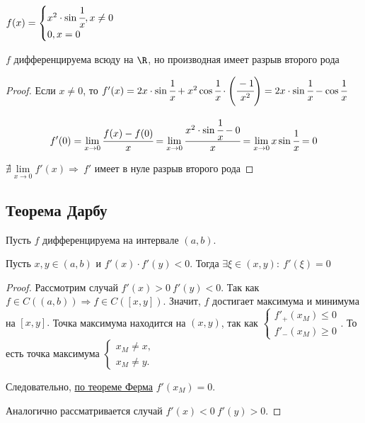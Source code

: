 \begin{example}
	$f(x) = \begin{cases}
		x^2 \cdot \sin \cfrac{1}{x}, x\neq 0 \\
		0, x = 0 \hfill
	\end{cases}$
	
	$f$ дифференцируема всюду на $\R$, но производная имеет разрыв второго рода
\end{example}
\begin{proof}
	Если $x\neq 0$, то $f'(x) = 2x \cdot\sin \cfrac{1}{x} + x^{2} \cos \cfrac{1}{x} \cdot \left(\cfrac{-1}{x^2}\right) = 2x\cdot\sin \cfrac{1}{x} - \cos \cfrac{1}{x} $
	
	$$f'(0) = \lim\limits_{x\to 0} \cfrac{f(x) - f(0)}{x} = \lim\limits_{x\to 0} \cfrac{x^2\cdot \sin \cfrac{1}{x} - 0}{x} =  \lim\limits_{x\to 0} x \sin \cfrac{1}{x} = 0$$
	
	$\nexists \lim\limits_{x\to 0} f'(x) \Rightarrow \ f'$ имеет в нуле разрыв второго рода 
\end{proof}

\subsection{Теорема Дарбу}

\begin{lemma}
	Пусть $f$ дифференцируема на интервале $(a, b)$. 
	
	Пусть $x, y \in (a, b)$ и $f'(x) \cdot f'(y) < 0$. Тогда $\exists \xi \in (x, y):\  f'(\xi) = 0$
\end{lemma}
\begin{proof}
	Рассмотрим случай $f'(x) > 0 \ f'(y) < 0$. Так как $f \in C((a, b)) \Rightarrow f \in C([x,y])$. Значит, $ f$ достигает максимума и минимума на $[x,y].$ Точка максимума находится на $(x,y)$, так как $\begin{cases}
		f'_{+}(x_{M}) \leq 0\\
		f'_{-}(x_{M}) \geq 0
	\end{cases}$. То есть точка максимума $\begin{cases}
	x_{M} \neq x,\\
	x_{M} \neq y.
	\end{cases}$
	
	Следовательно, \hyperlink{thrm6.1}{по теореме Ферма} $f'(x_{M}) = 0.$
	
	Аналогично рассматривается случай $f'(x) < 0 \ f'(y) > 0$.
\end{proof}

